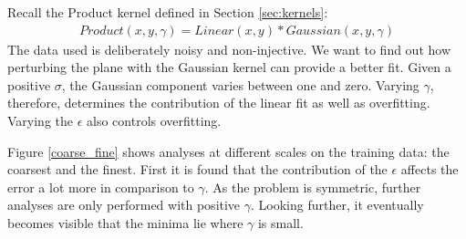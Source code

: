 \documentclass[12pt,a4paper,notitlepage,twoside]{scrbook}
\begin{document}
Recall the Product kernel defined in Section \ref{sec:kernels}: 
\begin{gather*}
Product(x,y,\gamma) = Linear(x,y)*Gaussian(x,y,\gamma)
\end{gather*}
The data used is deliberately noisy
and non-injective. We want to find out how perturbing the plane with the Gaussian kernel can provide a better fit. 
Given a positive $\sigma$, the Gaussian component varies between one and zero.
Varying $\gamma$, therefore, determines the contribution of the linear fit as well as overfitting.
Varying the $\epsilon$ also controls overfitting.

Figure \ref{coarse_fine} shows analyses at different scales on the training data: the coarsest and the finest.
First it is found that the
contribution of the $\epsilon$ affects the error a lot more in comparison to $\gamma$. As the
problem is symmetric, further analyses are only performed with positive $\gamma$. Looking
further, it eventually becomes visible that the minima lie where $\gamma$ is small. 
\end{document}
